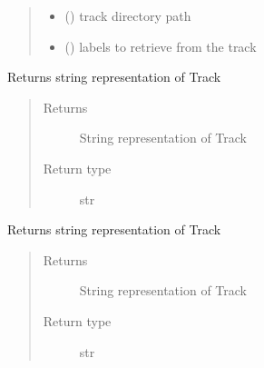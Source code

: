 \documentclass[letterpaper,10pt,english]{sphinxmanual}
\begin{document}
\begin{fulllineitems}
\begin{fulllineitems}
\begin{quote}
\begin{description}
\begin{itemize}
\item {} 
 () \textendash{} track directory path

\item {} 
 () \textendash{} labels to retrieve from the track

\end{itemize}

\end{description}\end{quote}

\end{fulllineitems}


\begin{fulllineitems}
\label{\detokenize{docs/source/preprocess:preprocess.track_classes.Track.__repr__}}
Returns string representation of Track
\begin{quote}\begin{description}
\item[{Returns}] \leavevmode
String representation of Track

\item[{Return type}] \leavevmode
str

\end{description}\end{quote}

\end{fulllineitems}


\begin{fulllineitems}
\label{\detokenize{docs/source/preprocess:preprocess.track_classes.Track.__str__}}
Returns string representation of Track
\begin{quote}\begin{description}
\item[{Returns}] \leavevmode
String representation of Track

\item[{Return type}] \leavevmode
str


\end{description}
\end{quote}
\end{fulllineitems}
\end{fulllineitems}
\end{document}
